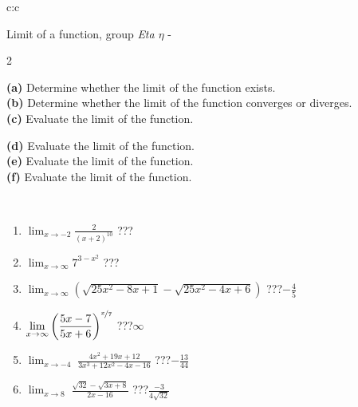 \documentclass[10pt]{report}
\begin{document}
\newpage
\thispagestyle{empty}
\begin{tabular}{c:c}
\begin{minipage}[c][104.5mm][t]{0.5\linewidth}
\begin{center}
\vspace{5mm}
{\huge Limit of a function, group \textit{Eta $\eta$} -}\\[5mm]
\begin{minipage}{0.95\linewidth}
\begin{center}
{\small \begin{multicols}{2} \raggedright
\textbf{(a)} Determine whether the limit of the function exists. \\[1mm]
\textbf{(b)} Determine whether the limit of the function converges or diverges. \\[1mm]
\textbf{(c)} Evaluate the limit of the function. \par \columnbreak
\textbf{(d)} Evaluate the limit of the function. \\[1mm]
\textbf{(e)} Evaluate the limit of the function. \\[1mm]
\textbf{(f)} Evaluate the limit of the function. \\[1mm]
\end{multicols}
}
\end{center}
\end{minipage}
\\[1mm]
\begin{minipage}{0.79\linewidth}
\begin{center}
\begin{varwidth}{\linewidth}
\setlength{\itemsep}{0pt}
\begin{enumerate}
\normalsize
\item $\displaystyle\lim_{x\to-2}{\frac{2}{(x+2)^{10}}}$\quad \dotfill\; ???\;\dotfill \quad {}
\item $\displaystyle\lim_{x\to\infty}{7^{3-x^2}}$\quad \dotfill\; ???\;\dotfill \quad {}
\item $\displaystyle\lim_{x\to\infty}{\left(\sqrt{25x^2-8x+1} - \sqrt{25x^2-4x+6}\right)}$\quad \dotfill\; ???\;\dotfill \quad $-\frac{4}{5}$
\item $\displaystyle\lim_{x\to\infty}{\left( \frac{5x-7}{5x+6} \right)^{\nicefrac{x}{7}}}$\quad \dotfill\; ???\;\dotfill \quad $\infty$
\item $\displaystyle\lim_{x\to -4}{\;\frac{4x^2+19x+12}{3x^3+12x^2-4x-16}}$\quad \dotfill\; ???\;\dotfill \quad $-\frac{13}{44}$
\item $\displaystyle\lim_{x\to 8}{\;\frac{\sqrt{32}-\sqrt{3x+8}}{2x-16}}$\quad \dotfill\; ???\;\dotfill \quad $\frac{-3}{4\sqrt{32}}$

\end{enumerate}
\end{varwidth}
\end{center}
\end{minipage}
\end{center}
\end{minipage}
\end{tabular}
\end{document}
